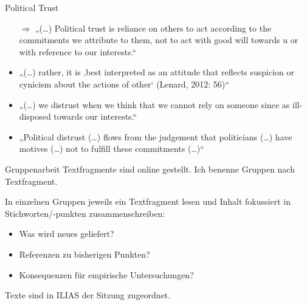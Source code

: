 \documentclass[11pt]{beamer}
\begin{document}
\begin{frame}[t]{Political Trust}
\begin{itemize}
	\item[$\Rightarrow$]„(…) Political trust is reliance on others to act according to the commitments we attribute to them, not to act with good will towards u or with reference to our interests.“ \parencite[455]{Festenstein2019}
	\item „(…) rather, it is ‚best interpreted as an attitude that reflects suspicion or cynicism about the actions of other‘ (Lenard, 2012: 56)“ \parencite[457]{Festenstein2019}
	\item „(…) we distrust when we think that we cannot rely on someone since as ill-disposed towards our interests.“ \parencite[457]{Festenstein2019}
	\item „Political distrust (…) flows from the judgement that politicians (…) have motives (…) not to fulfill these commitments (…)“ \parencite[457]{Festenstein2019}

\end{itemize}

\end{frame}

\begin{frame}[t]{Gruppenarbeit}
Textfragmente sind online gestellt. Ich benenne Gruppen nach Textfragment.

In einzelnen Gruppen jeweils ein Textfragment lesen und Inhalt fokussiert in Stichworten/-punkten zusammenschreiben:

\begin{itemize}
	\item Was wird neues geliefert?
	\item Referenzen zu bisherigen Punkten?
	\item Konsequenzen für empirische Untersuchungen?
\end{itemize}

Texte sind in ILIAS der Sitzung zugeordnet.

\end{frame}
\end{document}
